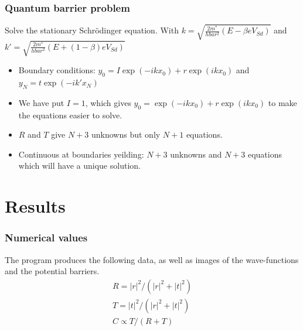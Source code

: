 \documentclass[•]{beamer}
\theoremstyle{remark}
\begin{document}
\begin{frame}\frametitle{Quantum barrier problem}
\begin{block}

Solve the stationary Schr\"odinger equation. With $k=\sqrt{\frac{2m^*}{hbar^2}(E-\beta e V_{Sd})}$ and $k'=\sqrt{\frac{2m^*}{hbar^2}(E+ (1-\beta) e V_{Sd})}$ 
\pause
\begin{itemize}
\item Boundary conditions: $y_{0} = I\exp{(-i k x_{0})} + r\exp{(i k x_{0})}$ and $y_{N} = t\exp{(-i k' x_{N})}$
\pause
\item We have put $I=1$, which gives $y_{0} = \exp{(-i k x_{0})} + r\exp{(i k x_{0})}$ to make the equations easier to solve.
\pause
\item $R$ and $T$ give $N+3$ unknowns but only $N+1$ equations. 
\pause
\item Continuous at boundaries yeilding: $N+3$ unknowns and $N+3$ equations which will have a unique solution.
\end{itemize}
\end{block}
\end{frame}

\section{Results}
\begin{frame}\frametitle{Numerical values}
\begin{block}

The program produces the following data, as well as images of the wave-functions and the potential barriers.
\begin{eqnarray*}
R=|r|^2/(|r|^2+|t|^2)\\
T=|t|^2/(|r|^2+|t|^2)\\
C \propto T/(R+T)
\end{eqnarray*}
\end{block}
\end{frame}
\end{document}
